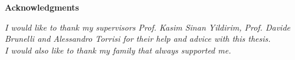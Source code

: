 \thispagestyle{empty}

\begin{center}
  {\bf \Huge Acknowledgments}
\end{center}

\vspace{4cm}
\emph{I  would like to thank my supervisors Prof. Kasim Sinan Yildirim, Prof. Davide Brunelli and Alessandro Torrisi for their help and advice with this thesis.\\
I would also like to thank my family that always supported me.}


  
  


